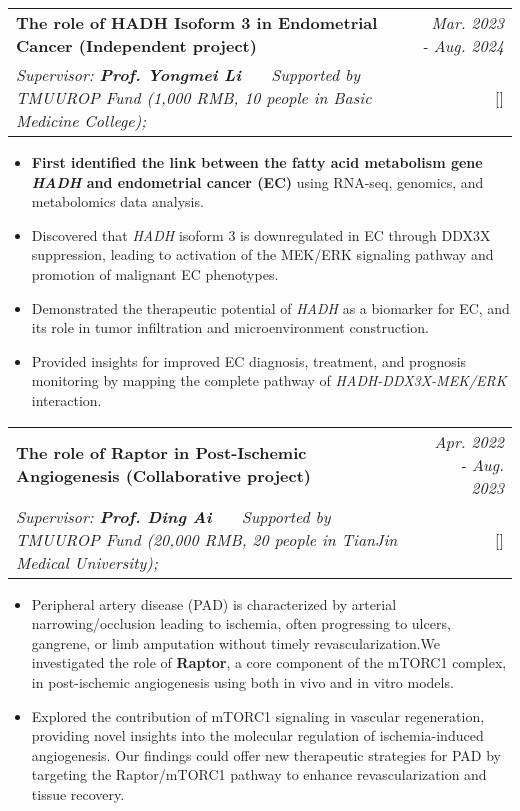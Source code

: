 \documentclass[a4paper,11pt]{article}
\makeatletter
\newcommand{\resumeProject}[4]{
\vspace{0.5mm}\item
    \begin{tabular*}{0.98\textwidth}[t]{l@{\extracolsep{\fill}}r}
        \textbf{#1} & \textit{\footnotesize{#3}} \\
        \footnotesize{\textit{#2}} & \footnotesize{#4}
    \end{tabular*}
    \vspace{-2.4mm}
}
\newcommand{\resumeItemListStart}{\begin{itemize}[leftmargin=*,labelsep=1mm,itemsep=0.5mm]}
\newcommand{\resumeItemListEnd}{\end{itemize}\vspace{-2mm}}
\makeatother
\begin{document}
\begin{justify}
\resumeProject
  {The role of HADH Isoform 3 in Endometrial Cancer \small{(Independent project)}}
  {Supervisor: \textbf{Prof. Yongmei Li} \ \ \ Supported by TMUUROP Fund (1,000 RMB, 10 people in Basic Medicine College);}
  {Mar. 2023 - Aug. 2024}
  {{}[\href{https://github.com/wunaiwuhuang/materials/tree/main/Award\_and\_honour\%E8\%8E\%B7\%E5\%A5\%96\%E8\%AF\%81\%E6\%98\%8E/innovation\%20and\%20Entrepreneurship\%20Competition}{\textcolor{darkblue}{\faGithub}}]}
\resumeItemListStart
  \item \textbf{First identified the link between the fatty acid metabolism gene \textit{HADH} and endometrial cancer (EC)} using RNA-seq, genomics, and metabolomics data analysis.
  \item Discovered that \textit{HADH} isoform 3 is downregulated in EC through DDX3X suppression, leading to activation of the MEK/ERK signaling pathway and promotion of malignant EC phenotypes.
  \item Demonstrated the therapeutic potential of \textit{HADH} as a biomarker for EC, and its role in tumor infiltration and microenvironment construction.
  \item Provided insights for improved EC diagnosis, treatment, and prognosis monitoring by mapping the complete pathway of \textit{HADH-DDX3X-MEK/ERK} interaction.
\resumeItemListEnd

\resumeProject
  {The role of Raptor in Post-Ischemic Angiogenesis \small{(Collaborative project)}}
  {Supervisor: \textbf{Prof. Ding Ai} \ \ \ Supported by TMUUROP Fund (20,000 RMB, 20 people in TianJin Medical University);}
  {Apr. 2022 - Aug. 2023}
  {{}[\href{https://github.com/wunaiwuhuang/materials/tree/main/Award\_and\_honour\%E8\%8E\%B7\%E5\%A5\%96\%E8\%AF\%81\%E6\%98\%8E/innovation\%20and\%20Entrepreneurship\%20Competition}{\textcolor{darkblue}{\faGithub}}]}
\resumeItemListStart
  \item Peripheral artery disease (PAD) is characterized by arterial narrowing/occlusion leading to ischemia, often progressing to ulcers, gangrene, or limb amputation without timely revascularization.We investigated the role of \textbf{Raptor}, a core component of the mTORC1 complex, in post-ischemic angiogenesis using both in vivo and in vitro models.
  \item Explored the contribution of mTORC1 signaling in vascular regeneration, providing novel insights into the molecular regulation of ischemia-induced angiogenesis. Our findings could offer new therapeutic strategies for PAD by targeting the Raptor/mTORC1 pathway to enhance revascularization and tissue recovery.
\resumeItemListEnd


\end{justify}
\end{document}
